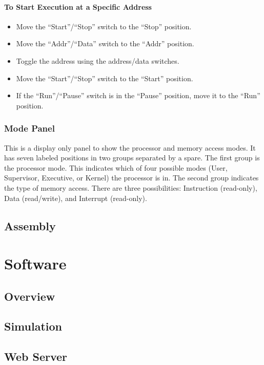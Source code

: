 \documentclass[10pt, openany]{book}
\newcommand{\switch}[2]{``#1''/``#2''}
\newcommand{\position}[1]{``#1''}
\begin{document}
\subsubsection{To Start Execution at a Specific Address}
\begin{itemize}
  \item Move the \switch{Start}{Stop} switch to the \position{Stop} position.
  \item Move the \switch{Addr}{Data} switch to the \position{Addr} position.
  \item Toggle the address using the address/data switches.
  \item Move the \switch{Start}{Stop} switch to the \position{Start} position.
  \item If the \switch{Run}{Pause} switch is in the \position{Pause} position, move it to the \position{Run} position.
\end{itemize}

\subsection{Mode Panel}
This is a display only panel to show the processor and memory access modes.  It has seven labeled positions in two groups separated by a spare.  The first group is the processor mode.  This indicates which of four possible modes (User, Supervisor, Executive, or Kernel) the processor is in.  The second group indicates the type of memory access.  There are three possibilities: Instruction (read-only), Data (read/write), and Interrupt (read-only).

\section{Assembly}

\chapter{Software}
\section{Overview}

\section{Simulation}

\section{Web Server}
\end{document}
